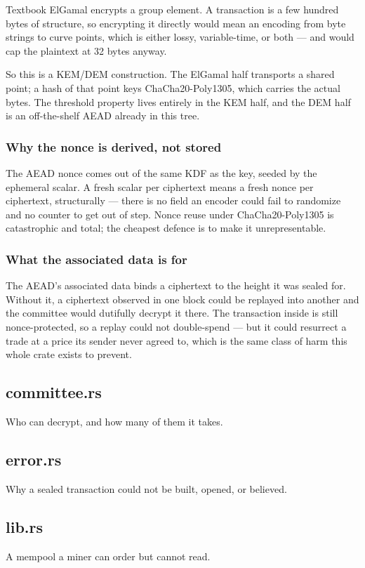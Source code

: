 \documentclass[11pt,a4paper]{article}
\begin{document}
Textbook ElGamal encrypts a group element. A transaction is a few hundred
bytes of structure, so encrypting it directly would mean an encoding from
byte strings to curve points, which is either lossy, variable-time, or
both — and would cap the plaintext at 32 bytes anyway.

So this is a KEM/DEM construction. The ElGamal half transports a shared
point; a hash of that point keys ChaCha20-Poly1305, which carries the actual
bytes. The threshold property lives entirely in the KEM half, and the DEM
half is an off-the-shelf AEAD already in this tree.

\subsubsection{Why the nonce is derived, not stored}

The AEAD nonce comes out of the same KDF as the key, seeded by the ephemeral
scalar. A fresh scalar per ciphertext means a fresh nonce per ciphertext,
structurally — there is no field an encoder could fail to randomize and no
counter to get out of step. Nonce reuse under ChaCha20-Poly1305 is
catastrophic and total; the cheapest defence is to make it unrepresentable.

\subsubsection{What the associated data is for}

The AEAD's associated data binds a ciphertext to the height it was sealed
for. Without it, a ciphertext observed in one block could be replayed into
another and the committee would dutifully decrypt it there. The transaction
inside is still nonce-protected, so a replay could not double-spend — but it
could resurrect a trade at a price its sender never agreed to, which is the
same class of harm this whole crate exists to prevent.

\subsection{committee.rs}
Who can decrypt, and how many of them it takes.

\subsection{error.rs}
Why a sealed transaction could not be built, opened, or believed.

\subsection{lib.rs}
A mempool a miner can order but cannot read.
\end{document}
